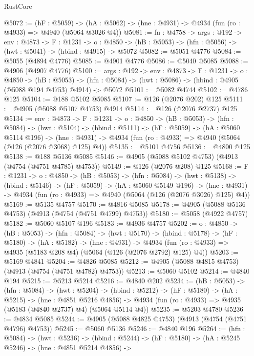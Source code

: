 \begin{lexlean}{RustCore}
\begin{coremodule}
@5072 := (hF : @5059) ->
  (hA : @5062) -> (hne : @4931) -> @4934 (fun (ro : @4933) => @4940 (@5064 @3026 @4))
@5081 := {fn : @4758} ->
  {args : @192} ->
  {env : @4873} ->
  {F : @1231} ->
  {o : @4850} -> (hB : @5053) -> (hfn : @5056) -> (hwt : @5041) -> (hbind : @4915) -> @5072
@5082 := @5051 @4776
@5084 := @5055 (@4894 @4776)
@5085 := @4901 @4776
@5086 := @5040 @5085
@5088 := @4906 (@4907 @4776)
@5100 := {args : @192} ->
  {env : @4873} ->
  {F : @1231} ->
  {o : @4850} ->
  (hB : @5053) ->
  (hfn : @5084) -> (hwt : @5086) -> (hbind : @4905 (@5088 @194 @4753) @4914) -> @5072
@5101 := @5082 @4744
@5102 := @4786 @125
@5104 := @188 @5102 @5085
@5107 := @126 (@2076 @202) @125
@5111 := @4905 (@5088 @5107 @4753) @4914
@5114 := @126 (@2076 @2737) @125
@5134 := {env : @4873} ->
  {F : @1231} ->
  {o : @4850} ->
  (hB : @5053) ->
  (hfn : @5084) ->
  (hwt : @5104) ->
  (hbind : @5111) ->
  (hF : @5059) ->
  (hA : @5060 @5114 @196) ->
  (hne : @4931) -> @4934 (fun (ro : @4933) => @4940 (@5064 (@126 (@2076 @3068) @125) @4))
@5135 := @5101 @4756
@5136 := @4800 @125
@5138 := @188 @5136 @5085
@5146 := @4905 (@5088 @5102 @4753) (@4913 (@4754 (@4751 @4785) @4753))
@5149 := @126 (@2076 @208) @125
@5168 := {F : @1231} ->
  {o : @4850} ->
  (hB : @5053) ->
  (hfn : @5084) ->
  (hwt : @5138) ->
  (hbind : @5146) ->
  (hF : @5059) ->
  (hA : @5060 @5149 @196) ->
  (hne : @4931) -> @4934 (fun (ro : @4933) => @4940 (@5064 (@126 (@2076 @3026) @125) @4))
@5169 := @5135 @4757
@5170 := @4816 @5085
@5178 := @4905 (@5088 @5136 @4753) (@4913 (@4754 (@4751 @4799) @4753))
@5180 := @5058 (@4922 @4757)
@5182 := @5060 @5107 @196
@5183 := @4936 @4757
@5202 := {o : @4850} ->
  (hB : @5053) ->
  (hfn : @5084) ->
  (hwt : @5170) ->
  (hbind : @5178) ->
  (hF : @5180) ->
  (hA : @5182) ->
  (hne : @4931) ->
  @4934 (fun (ro : @4933) => @4935 (@5183 @208 @4) (@5064 (@126 (@2076 @2792) @125) @4))
@5203 := @5169 @4841
@5204 := @4826 @5085
@5212 := @4905 (@5088 @4815 @4753) (@4913 (@4754 (@4751 @4782) @4753))
@5213 := @5060 @5102
@5214 := @4840 @194
@5215 := @5213 @5214
@5216 := @4840 @202
@5234 := (hB : @5053) ->
  (hfn : @5084) ->
  (hwt : @5204) ->
  (hbind : @5212) ->
  (hF : @5180) ->
  (hA : @5215) ->
  (hne : @4851 @5216 @4856) ->
  @4934 (fun (ro : @4933) => @4935 (@5183 (@4840 @2737) @4) (@5064 @5114 @4))
@5235 := @5203 @4780
@5236 := @4834 @5085
@5244 := @4905 (@5088 @4825 @4753) (@4913 (@4754 (@4751 @4796) @4753))
@5245 := @5060 @5136
@5246 := @4840 @196
@5264 := (hfn : @5084) ->
  (hwt : @5236) ->
  (hbind : @5244) ->
  (hF : @5180) ->
  (hA : @5245 @5246) ->
  (hne : @4851 @5214 @4856) ->

\end{coremodule}
\end{lexlean}
